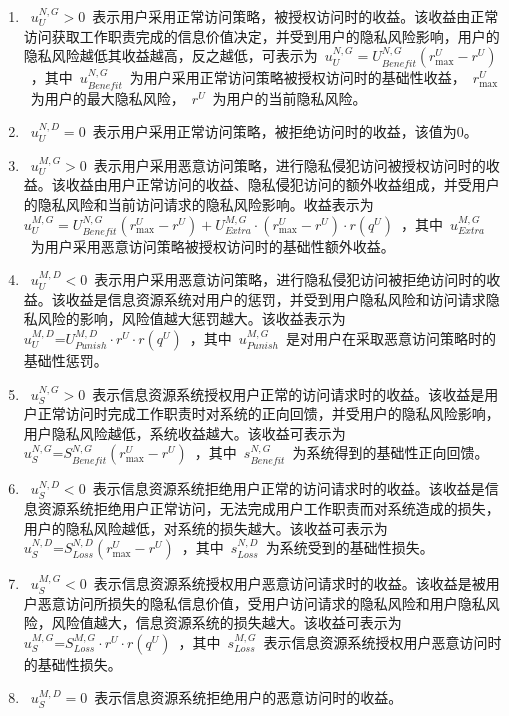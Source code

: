 \begin{enumerate}
	\item  ~$u_{U}^{N,G}>0$~表示用户采用正常访问策略，被授权访问时的收益。该收益由正常访问获取工作职责完成的信息价值决定，并受到用户的隐私风险影响，用户的隐私风险越低其收益越高，反之越低，可表示为~$u_{U}^{N,G}=U_{Benefit}^{N,G}(r_{\max }^{U}-{{r}^{U}})$~，其中~$u_{Benefit}^{N,G}$~为用户采用正常访问策略被授权访问时的基础性收益，~$r_{\max }^{U}$~为用户的最大隐私风险，~${{r}^{U}}$~为用户的当前隐私风险。
	\item  ~$u_{U}^{N,D}=0$~表示用户采用正常访问策略，被拒绝访问时的收益，该值为0。
	\item  ~$u_{U}^{M,G}>0$~表示用户采用恶意访问策略，进行隐私侵犯访问被授权访问时的收益。该收益由用户正常访问的收益、隐私侵犯访问的额外收益组成，并受用户的隐私风险和当前访问请求的隐私风险影响。收益表示为~$u_{U}^{M,G}=U_{Benefit}^{N,G}(r_{\max }^{U}-{{r}^{U}})+U_{Extra}^{M,G}\cdot (r_{\max }^{U}-{{r}^{U}})\cdot r({{q}^{U}})$~，其中~$u_{Extra}^{M,G}$~为用户采用恶意访问策略被授权访问时的基础性额外收益。
	\item  ~$u_{U}^{M,D}<0$~表示用户采用恶意访问策略，进行隐私侵犯访问被拒绝访问时的收益。该收益是信息资源系统对用户的惩罚，并受到用户隐私风险和访问请求隐私风险的影响，风险值越大惩罚越大。该收益表示为~$u_{U}^{M,D}\text{=}U_{Punish}^{M,D}\cdot {{r}^{U}}\cdot r({{q}^{U}})$~，其中~$u_{Punish}^{M,G}$~是对用户在采取恶意访问策略时的基础性惩罚。
	\item  ~$u_{S}^{N,G}>0$~表示信息资源系统授权用户正常的访问请求时的收益。该收益是用户正常访问时完成工作职责时对系统的正向回馈，并受用户的隐私风险影响，用户隐私风险越低，系统收益越大。该收益可表示为~$u_{S}^{N,G}\text{=}S_{Benefit}^{N,G}(r_{\max }^{U}-{{r}^{U}})$~，其中~$s_{Benefit}^{N,G}$~为系统得到的基础性正向回馈。
	\item ~$u_{S}^{N,D}<0$~表示信息资源系统拒绝用户正常的访问请求时的收益。该收益是信息资源系统拒绝用户正常访问，无法完成用户工作职责而对系统造成的损失，用户的隐私风险越低，对系统的损失越大。该收益可表示为~$u_{S}^{N,D}\text{=}S_{Loss}^{N,D}(r_{\max }^{U}-{{r}^{U}})$~，其中~$s_{Loss}^{N,D}$~为系统受到的基础性损失。
	\item  ~$u_{S}^{M,G}<0$~表示信息资源系统授权用户恶意访问请求时的收益。该收益是被用户恶意访问所损失的隐私信息价值，受用户访问请求的隐私风险和用户隐私风险，风险值越大，信息资源系统的损失越大。该收益可表示为~$u_{S}^{M,G}\text{=}S_{Loss}^{M,G}\cdot {{r}^{U}}\cdot r({{q}^{U}})$~，其中~$s_{Loss}^{M,G}$~表示信息资源系统授权用户恶意访问时的基础性损失。
	\item ~$u_{S}^{M,D}=0$~表示信息资源系统拒绝用户的恶意访问时的收益。
\end{enumerate}

